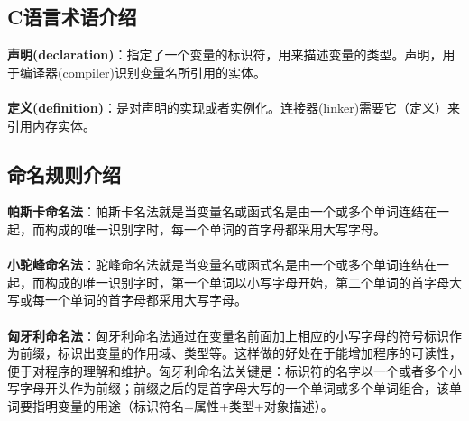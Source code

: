\subsection{C语言术语介绍}
\textbf{声明(declaration)}：指定了一个变量的标识符，用来描述变量的类型。声明，用于编译器(compiler)识别变量名所引用的实体。\\
\\
\textbf{定义(definition)}：是对声明的实现或者实例化。连接器(linker)需要它（定义）来引用内存实体。\\

\subsection{命名规则介绍}
\textbf{帕斯卡命名法}：帕斯卡名法就是当变量名或函式名是由一个或多个单词连结在一起，而构成的唯一识别字时，每一个单词的首字母都采用大写字母。 \\
\\
\textbf{小驼峰命名法}：驼峰命名法就是当变量名或函式名是由一个或多个单词连结在一起，而构成的唯一识别字时，第一个单词以小写字母开始，第二个单词的首字母大写或每一个单词的首字母都采用大写字母。\\
\\
\textbf{匈牙利命名法}：匈牙利命名法通过在变量名前面加上相应的小写字母的符号标识作为前缀，标识出变量的作用域、类型等。这样做的好处在于能增加程序的可读性，便于对程序的理解和维护。匈牙利命名法关键是：标识符的名字以一个或者多个小写字母开头作为前缀；前缀之后的是首字母大写的一个单词或多个单词组合，该单词要指明变量的用途（标识符名=属性+类型+对象描述）。